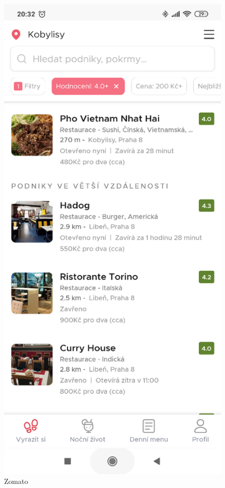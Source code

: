 \begin{figure}[ht]
    \centering
    \begin{minipage}{0.45\linewidth}
       \centering
    \includegraphics[width=0.75\linewidth]{img/analysis/zomato.png}
    \caption{Zomato \cite{app-zomato}}
    \label{fig:zomato}
    \end{minipage}\hfill
    \begin{minipage}{0.45\linewidth}
        \centering

\end{minipage}
\end{figure}
